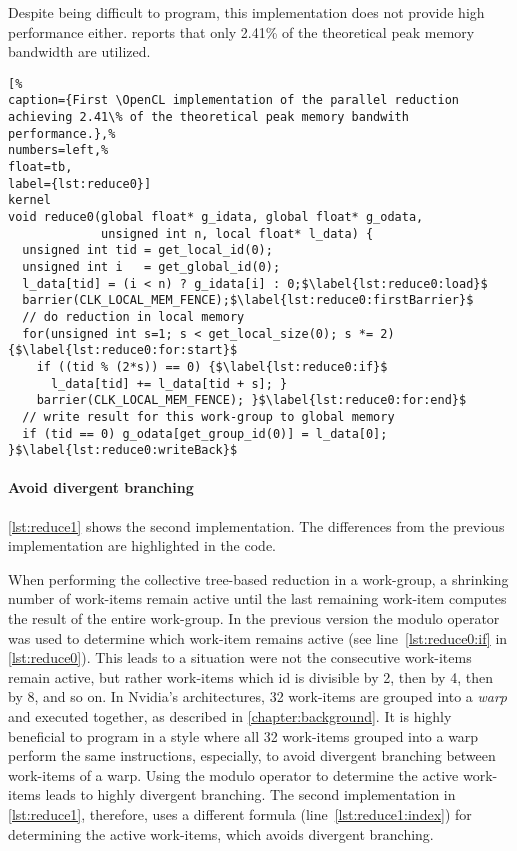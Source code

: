 Despite being difficult to program, this implementation does not provide high performance either.
\citeauthor{Harris2007} reports that only 2.41\% of the theoretical peak memory bandwidth are utilized. 

\begin{lstlisting}[%                                                             
caption={First \OpenCL implementation of the parallel reduction achieving 2.41\% of the theoretical peak memory bandwith performance.},%
numbers=left,%
float=tb,
label={lst:reduce0}]
kernel
void reduce0(global float* g_idata, global float* g_odata,
             unsigned int n, local float* l_data) {
  unsigned int tid = get_local_id(0);
  unsigned int i   = get_global_id(0);
  l_data[tid] = (i < n) ? g_idata[i] : 0;$\label{lst:reduce0:load}$
  barrier(CLK_LOCAL_MEM_FENCE);$\label{lst:reduce0:firstBarrier}$
  // do reduction in local memory
  for(unsigned int s=1; s < get_local_size(0); s *= 2) {$\label{lst:reduce0:for:start}$
    if ((tid % (2*s)) == 0) {$\label{lst:reduce0:if}$
      l_data[tid] += l_data[tid + s]; }
    barrier(CLK_LOCAL_MEM_FENCE); }$\label{lst:reduce0:for:end}$
  // write result for this work-group to global memory
  if (tid == 0) g_odata[get_group_id(0)] = l_data[0]; }$\label{lst:reduce0:writeBack}$
\end{lstlisting}

\FloatBarrier
\newpage

\paragraph{Avoid divergent branching}

\autoref{lst:reduce1} shows the second implementation.
The differences from the previous implementation are highlighted in the code.

When performing the collective tree-based reduction in a work-group, a shrinking number of work-items remain active until the last remaining work-item computes the result of the entire work-group.
In the previous version the modulo operator was used to determine which work-item remains active (see line~\ref{lst:reduce0:if} in \autoref{lst:reduce0}).
This leads to a situation were not the consecutive work-items remain active, but rather work-items which id is divisible by 2, then by 4, then by 8, and so on.
In Nvidia's \GPU architectures, 32 work-items are grouped into a \emph{warp} and executed together, as described in \autoref{chapter:background}.
It is highly beneficial to program in a style where all 32 work-items grouped into a warp perform the same instructions, especially, to avoid divergent branching between work-items of a warp.
Using the modulo operator to determine the active work-items leads to highly divergent branching.
The second implementation in \autoref{lst:reduce1}, therefore, uses a different formula (line~\ref{lst:reduce1:index}) for determining the active work-items, which avoids divergent branching.

